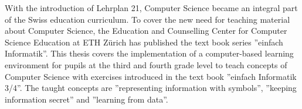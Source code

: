 With the introduction of Lehrplan 21, Computer Science became an integral part of the Swiss education curriculum. To cover the new need for teaching material about Computer Science, the Education and Counselling Center for Computer Science Education at ETH Zürich has published the text book series ''einfach Informatik''. 
This thesis covers the implementation of a computer-based learning environment for pupils at the third and fourth grade level to teach concepts of Computer Science with exercises introduced in the text book ''einfach Informatik 3/4''. The taught concepts are ''representing information with symbols'', ''keeping information secret'' and ''learning from data''.